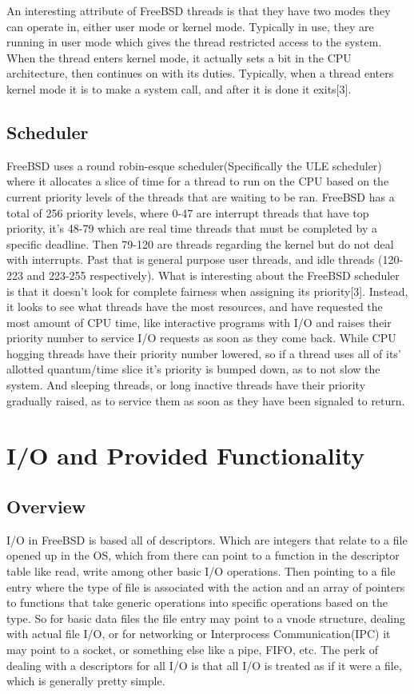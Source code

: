 \documentclass{article}
\begin{document}
    An interesting attribute of FreeBSD threads is that they have two modes they can operate in, either user mode or kernel mode. Typically in use, they are running in user mode which gives the thread restricted access to the system. When the thread enters kernel mode, it actually sets a bit in the CPU architecture, then continues on with its duties. Typically, when a thread enters kernel mode it is to make a system call, and after it is done it exits[3].

\subsection{Scheduler}
	FreeBSD uses a round robin-esque scheduler(Specifically the ULE scheduler) where it allocates a slice of time for a thread to run on the CPU based on the current priority levels of the threads that are waiting to be ran. FreeBSD has a total of 256 priority levels, where 0-47 are interrupt threads that have top priority, it’s 48-79 which are real time threads that must be completed by a specific deadline. Then 79-120 are threads regarding the kernel but do not deal with interrupts. Past that is general purpose user threads, and idle threads (120-223 and 223-255 respectively). What is interesting about the FreeBSD scheduler is that it doesn’t look for complete fairness when assigning its priority[3]. Instead, it looks to see what threads have the most resources, and have requested the most amount of CPU time, like interactive programs with I/O and raises their priority number to service I/O requests as soon as they come back. While CPU hogging threads have their priority number lowered, so if a thread uses all of its’ allotted quantum/time slice it’s priority is bumped down, as to not slow the system. And sleeping threads, or long inactive threads have their priority gradually raised, as to service them as soon as they have been signaled to return.

\section{I/O and Provided Functionality}
\subsection{Overview}
    I/O in FreeBSD is based all of descriptors. Which are integers that relate to a file opened up in the OS, which from there can point to a function in the descriptor table like read, write among other basic I/O operations. Then pointing to a file entry where the type of file is associated with the action and an array of pointers to functions that take generic operations into specific operations based on the type. So for basic data files the file entry may point to a vnode structure, dealing with actual file I/O, or for networking or Interprocess Communication(IPC) it may point to a socket, or something else like a pipe, FIFO, etc. The perk of dealing with a descriptors for all I/O is that all I/O is treated as if it were a file, which is generally pretty simple.
\end{document}
